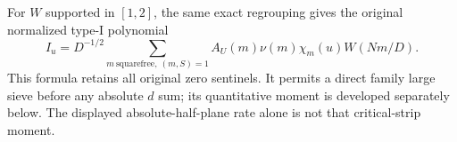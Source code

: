 For $W$ supported in $[1,2]$, the same exact regrouping gives the
original normalized type-I polynomial
\[
 I_u=D^{-1/2}\sum_{m\ \mathrm{squarefree},\ (m,S)=1}
 A_U(m)\nu(m)\chi_m(u)W(Nm/D).
\]
This formula retains all original zero sentinels. It permits a direct
family large sieve before any absolute $d$ sum; its quantitative moment
is developed separately below. The displayed absolute-half-plane rate
alone is not that critical-strip moment.
